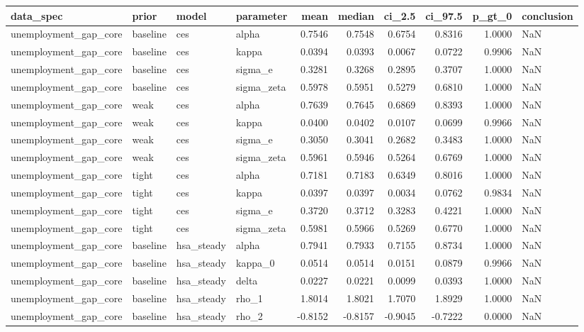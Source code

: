 \begin{tabular}{llllrrrrrl}
\toprule
data\_spec & prior & model & parameter & mean & median & ci\_2.5 & ci\_97.5 & p\_gt\_0 & conclusion \\
\midrule
unemployment\_gap\_core & baseline & ces & alpha & 0.7546 & 0.7548 & 0.6754 & 0.8316 & 1.0000 & NaN \\
unemployment\_gap\_core & baseline & ces & kappa & 0.0394 & 0.0393 & 0.0067 & 0.0722 & 0.9906 & NaN \\
unemployment\_gap\_core & baseline & ces & sigma\_e & 0.3281 & 0.3268 & 0.2895 & 0.3707 & 1.0000 & NaN \\
unemployment\_gap\_core & baseline & ces & sigma\_zeta & 0.5978 & 0.5951 & 0.5279 & 0.6810 & 1.0000 & NaN \\
unemployment\_gap\_core & weak & ces & alpha & 0.7639 & 0.7645 & 0.6869 & 0.8393 & 1.0000 & NaN \\
unemployment\_gap\_core & weak & ces & kappa & 0.0400 & 0.0402 & 0.0107 & 0.0699 & 0.9966 & NaN \\
unemployment\_gap\_core & weak & ces & sigma\_e & 0.3050 & 0.3041 & 0.2682 & 0.3483 & 1.0000 & NaN \\
unemployment\_gap\_core & weak & ces & sigma\_zeta & 0.5961 & 0.5946 & 0.5264 & 0.6769 & 1.0000 & NaN \\
unemployment\_gap\_core & tight & ces & alpha & 0.7181 & 0.7183 & 0.6349 & 0.8016 & 1.0000 & NaN \\
unemployment\_gap\_core & tight & ces & kappa & 0.0397 & 0.0397 & 0.0034 & 0.0762 & 0.9834 & NaN \\
unemployment\_gap\_core & tight & ces & sigma\_e & 0.3720 & 0.3712 & 0.3283 & 0.4221 & 1.0000 & NaN \\
unemployment\_gap\_core & tight & ces & sigma\_zeta & 0.5981 & 0.5966 & 0.5269 & 0.6770 & 1.0000 & NaN \\
unemployment\_gap\_core & baseline & hsa\_steady & alpha & 0.7941 & 0.7933 & 0.7155 & 0.8734 & 1.0000 & NaN \\
unemployment\_gap\_core & baseline & hsa\_steady & kappa\_0 & 0.0514 & 0.0514 & 0.0151 & 0.0879 & 0.9966 & NaN \\
unemployment\_gap\_core & baseline & hsa\_steady & delta & 0.0227 & 0.0221 & 0.0099 & 0.0393 & 1.0000 & NaN \\
unemployment\_gap\_core & baseline & hsa\_steady & rho\_1 & 1.8014 & 1.8021 & 1.7070 & 1.8929 & 1.0000 & NaN \\
unemployment\_gap\_core & baseline & hsa\_steady & rho\_2 & -0.8152 & -0.8157 & -0.9045 & -0.7222 & 0.0000 & NaN \\

\end{tabular}
